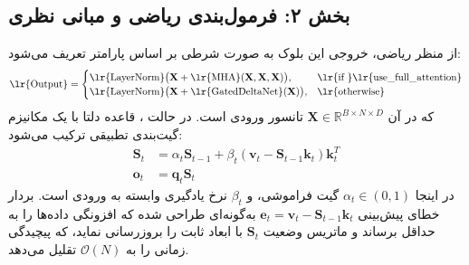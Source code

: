 \subsection*{بخش ۲: فرمول‌بندی ریاضی و مبانی نظری }
از منظر ریاضی، خروجی این بلوک به صورت شرطی بر اساس پارامتر  تعریف می‌شود:
\begin{equation}
\text{\lr{Output}} = \begin{cases}
\text{\lr{LayerNorm}}\big(\mathbf{X} + \text{\lr{MHA}}(\mathbf{X}, \mathbf{X}, \mathbf{X})\big), & \text{\lr{if }} \text{\lr{use\_full\_attention}} \\
\text{\lr{LayerNorm}}\big(\mathbf{X} + \text{\lr{GatedDeltaNet}}(\mathbf{X})\big), & \text{\lr{otherwise}}
\end{cases}
\end{equation}
که در آن $\mathbf{X} \in \mathbb{R}^{B \times N \times D}$ تانسور ورودی است.
در حالت ، قاعده دلتا با یک مکانیزم گیت‌بندی تطبیقی ترکیب می‌شود:
\begin{align}
\mathbf{S}_t &= \alpha_t \mathbf{S}_{t-1} + \beta_t (\mathbf{v}_t - \mathbf{S}_{t-1}\mathbf{k}_t) \mathbf{k}_t^T \\
\mathbf{o}_t &= \mathbf{q}_t \mathbf{S}_t
\end{align}
در اینجا $\alpha_t \in (0, 1)$ گیت فراموشی، و $\beta_t$ نرخ یادگیری وابسته به ورودی است. بردار خطای پیش‌بینی $\mathbf{e}_t = \mathbf{v}_t - \mathbf{S}_{t-1}\mathbf{k}_t$ به‌گونه‌ای طراحی شده که افزونگی داده‌ها را به حداقل برساند و ماتریس وضعیت $\mathbf{S}_t$ با ابعاد ثابت را بروزرسانی نماید، که پیچیدگی زمانی را به $\mathcal{O}(N)$ تقلیل می‌دهد.

